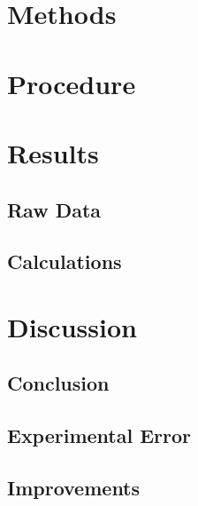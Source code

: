 \documentclass{article}
\begin{document}
\section*{Methods}%

\section*{Procedure} %

\section*{Results} %
\subsection*{Raw Data} %

\subsection*{Calculations}%

\section*{Discussion}%
\subsection*{Conclusion}

\subsection*{Experimental Error} %

\subsection*{Improvements} %
\end{document}
